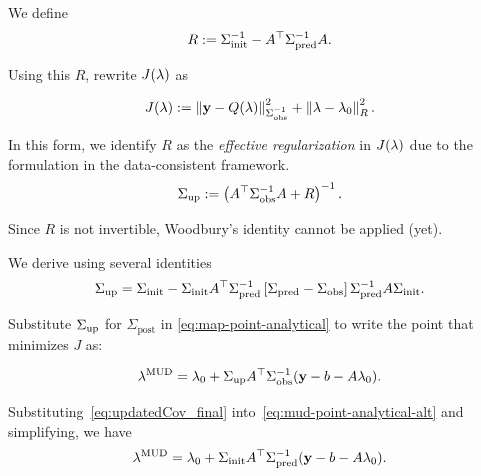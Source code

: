 \begin{frame}[t]

We define
\begin{equation}\label{eq:eff_reg}
	R := \nolinebreak \initialCov^{-1} - \nolinebreak A^\top \predictedCov^{-1} A.
\end{equation}

Using this $R$, rewrite $J(\lambda)$ as

\begin{equation}\label{eq:dci-objective-alt}
J(\lambda):= \left\Vert\mathbf{y} - Q(\lambda)\right\Vert_{\Sigma_\text{obs}^{-1}}^2 + \left\Vert\lambda - \lambda_0\right\Vert_{R}^2.
\end{equation}

\vskip 12pt
In this form, we identify $R$ as the {\em effective regularization} in $J(\lambda)$ due to the formulation in the data-consistent framework.
\begin{equation}
	\Sigma_\text{up} := \left(A^\top \Sigma_\text{obs}^{-1} A + R\right)^{-1}.
\end{equation}

Since $R$ is not invertible, Woodbury's identity cannot be applied (yet).
\end{frame}

\begin{frame}[t]
\centering
We derive using several identities
\begin{equation}\label{eq:updatedCov_final}
	\Sigma_\text{up} = \Sigma_\text{init} - \Sigma_\text{init} A^\top \Sigma_\text{pred}^{-1}\left[\Sigma_\text{pred}-\Sigma_\text{obs}\right]\Sigma_\text{pred}^{-1}A\Sigma_\text{init}.
\end{equation}

\vskip 12pt
Substitute $\Sigma_\text{up}$ for $\Sigma_\text{post}$ in \eqref{eq:map-point-analytical} to write the point that minimizes $J$ as:

\begin{equation}\label{eq:mud-point-analytical-alt}
\lambda^{\text{MUD}} = \lambda_0 + \Sigma_\text{up} A^\top \Sigma_\text{obs}^{-1} (\mathbf{y} - b - A\lambda_0).
\end{equation}

\vskip 12pt
Substituting~\eqref{eq:updatedCov_final} into~\eqref{eq:mud-point-analytical-alt} and simplifying, we have
\begin{equation}\label{eq:mud-point-analytical-final}
	\lambda^{\text{MUD}} = \lambda_0 + \Sigma_\text{init} A^\top \Sigma_\text{pred}^{-1}(\mathbf{y} - b - A\lambda_0).
\end{equation}

\end{frame}

